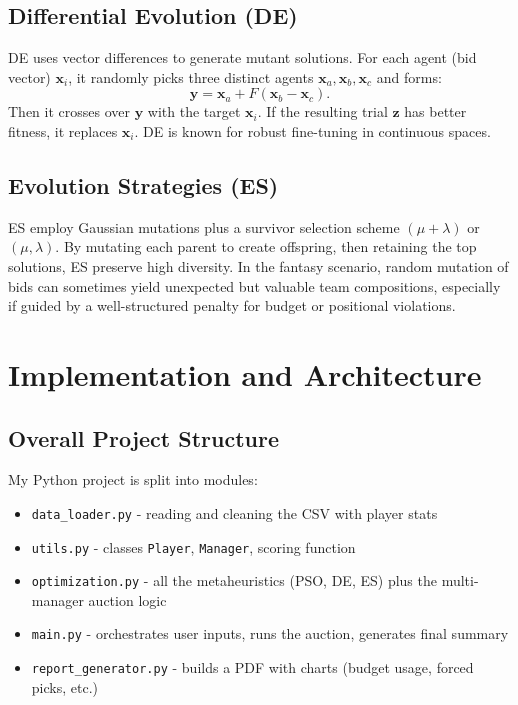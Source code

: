 \documentclass[sigconf]{acmart}
\begin{document}
	\subsection{Differential Evolution (DE)}
	DE uses vector differences to generate mutant solutions. For each agent (bid vector) $\mathbf{x}_i$, it randomly picks three distinct agents $\mathbf{x}_a,\mathbf{x}_b,\mathbf{x}_c$ and forms:
	\[
	\mathbf{y} = \mathbf{x}_a + F(\mathbf{x}_b - \mathbf{x}_c).
	\]
	Then it crosses over $\mathbf{y}$ with the target $\mathbf{x}_i$. If the resulting trial $\mathbf{z}$ has better fitness, it replaces $\mathbf{x}_i$. DE is known for robust fine-tuning in continuous spaces.
	
	\subsection{Evolution Strategies (ES)}
	ES employ Gaussian mutations plus a survivor selection scheme $(\mu+\lambda)$ or $(\mu,\lambda)$. By mutating each parent to create offspring, then retaining the top solutions, ES preserve high diversity. In the fantasy scenario, random mutation of bids can sometimes yield unexpected but valuable team compositions, especially if guided by a well-structured penalty for budget or positional violations.
	
	\section{Implementation and Architecture}
	\label{sec:implementation}
	
	\subsection{Overall Project Structure}
	My Python project is split into modules:
	\begin{itemize}
\item \texttt{data\_loader.py} - reading and cleaning the CSV with player stats
\item \texttt{utils.py} - classes \texttt{Player}, \texttt{Manager}, scoring function
\item \texttt{optimization.py} - all the metaheuristics (PSO, DE, ES) plus the multi-manager auction logic
\item \texttt{main.py} - orchestrates user inputs, runs the auction, generates final summary
\item \texttt{report\_generator.py} - builds a PDF with charts (budget usage, forced picks, etc.)
	\end{itemize}
	
\end{document}
